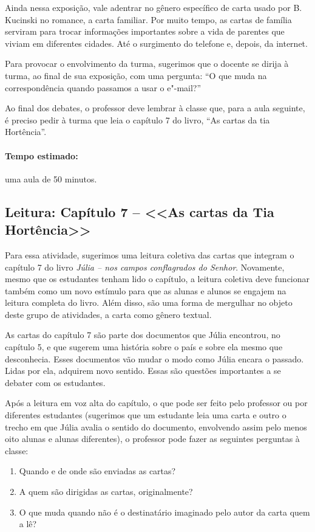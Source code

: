 \documentclass[12pt]{extarticle}
\begin{document}
Ainda nessa exposição, vale adentrar no gênero específico de carta usado
por B. Kucinski no romance, a carta familiar. Por muito tempo, as cartas
de família serviram para trocar informações importantes sobre a vida de
parentes que viviam em diferentes cidades. Até o surgimento do telefone
e, depois, da internet.

Para provocar o envolvimento da turma, sugerimos que o docente se dirija
à turma, ao final de sua exposição, com uma pergunta: ``O que muda na
correspondência quando passamos a usar o e"-mail?''

Ao final dos debates, o professor deve lembrar à classe que, para a aula
seguinte, é preciso pedir à turma que leia o capítulo 7 do livro, ``As
cartas da tia Hortência''.

\paragraph{Tempo estimado:} uma aula de 50 minutos.

\subsection{Leitura: Capítulo 7 -- <<As cartas da Tia Hortência>>}

Para essa atividade, sugerimos uma leitura coletiva das cartas que
integram o capítulo 7 do livro \emph{Júlia -- nos campos conflagrados do
Senhor}. Novamente, mesmo que os estudantes tenham lido o capítulo, a
leitura coletiva deve funcionar também como um novo estímulo para que as
alunas e alunos se engajem na leitura completa do livro. Além disso, são
uma forma de mergulhar no objeto deste grupo de atividades, a carta como
gênero textual.

As cartas do capítulo 7 são parte dos documentos que Júlia encontrou, no
capítulo 5, e que sugerem uma história sobre o país e sobre ela mesmo
que desconhecia. Esses documentos vão mudar o modo como Júlia encara o
passado. Lidas por ela, adquirem novo sentido. Essas são questões
importantes a se debater com os estudantes.

Após a leitura em voz alta do capítulo, o que pode ser feito pelo
professor ou por diferentes estudantes (sugerimos que um estudante leia
uma carta e outro o trecho em que Júlia avalia o sentido do documento,
envolvendo assim pelo menos oito alunas e alunas diferentes), o
professor pode fazer as seguintes perguntas à classe:

\begin{enumerate}

\item Quando e de onde são enviadas as cartas?

\item A quem são dirigidas as cartas, originalmente?

\item O que muda quando não é o destinatário imaginado pelo autor da carta
  quem a lê?

\end{enumerate}
\end{document}

